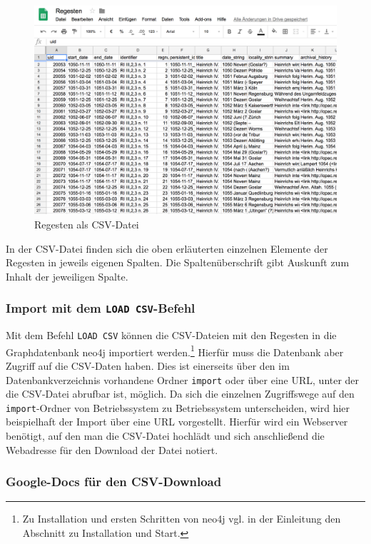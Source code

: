 \begin{figure}
\centering
\includegraphics{Bilder/RI2Graph/ReggH4-Regestentabelle.png}
\caption{Regesten als CSV-Datei}
\end{figure}

In der CSV-Datei finden sich die oben erläuterten einzelnen Elemente der
Regesten in jeweils eigenen Spalten. Die Spaltenüberschrift gibt
Auskunft zum Inhalt der jeweiligen Spalte.

\hypertarget{import-mit-dem-load-csv-befehl}{%
\subsubsection{\texorpdfstring{Import mit dem
\texttt{LOAD\ CSV}-Befehl}{Import mit dem LOAD CSV-Befehl}}\label{import-mit-dem-load-csv-befehl}}

Mit dem Befehl \texttt{LOAD\ CSV} können die CSV-Dateien mit den
Regesten in die Graphdatenbank neo4j importiert werden.\footnote{Zu
  Installation und ersten Schritten von neo4j vgl. in der Einleitung den
  Abschnitt zu Installation und Start.} Hierfür muss die Datenbank aber
Zugriff auf die CSV-Daten haben. Dies ist einerseits über den im
Datenbankverzeichnis vorhandene Ordner \texttt{import} oder über eine
URL, unter der die CSV-Datei abrufbar ist, möglich. Da sich die
einzelnen Zugriffswege auf den \texttt{import}-Ordner von Betriebssystem
zu Betriebssystem unterscheiden, wird hier beispielhaft der Import über
eine URL vorgestellt. Hierfür wird ein Webserver benötigt, auf den man
die CSV-Datei hochlädt und sich anschließend die Webadresse für den
Download der Datei notiert.

\hypertarget{google-docs-fuxfcr-den-csv-download}{%
\subsubsection{Google-Docs für den
CSV-Download}\label{google-docs-fuxfcr-den-csv-download}}

